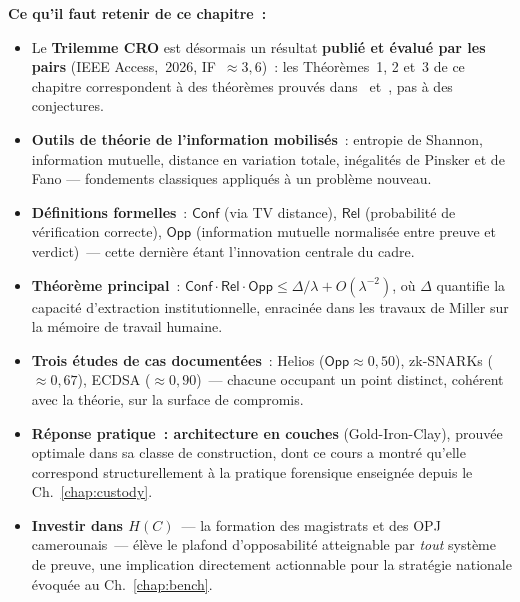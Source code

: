 \separateur

\begin{boxresume}
\textbf{Ce qu'il faut retenir de ce chapitre~:}
\begin{itemize}
    \item Le \textbf{Trilemme CRO} est désormais un résultat
          \textbf{publié et évalué par les pairs}
          (IEEE Access,~2026, IF~$\approx 3{,}6$)~: les
          Théorèmes~1, 2 et~3 de ce chapitre correspondent à des
          théorèmes prouvés dans~\cite{minka2026clo}
          et~\cite{minka2026conditional}, pas à des conjectures.

    \item \textbf{Outils de théorie de l'information mobilisés}~:
          entropie de Shannon, information mutuelle, distance en
          variation totale, inégalités de Pinsker et de Fano
          --- fondements classiques appliqués à un problème nouveau.

    \item \textbf{Définitions formelles}~: $\mathsf{Conf}$ (via TV
          distance), $\mathsf{Rel}$ (probabilité de vérification
          correcte), $\mathsf{Opp}$ (information mutuelle normalisée
          entre preuve et verdict)~--- cette dernière étant
          l'innovation centrale du cadre.

    \item \textbf{Théorème principal}~: $\mathsf{Conf} \cdot
          \mathsf{Rel} \cdot \mathsf{Opp} \leq \Delta/\lambda +
          O(\lambda^{-2})$, où $\Delta$ quantifie la capacité
          d'extraction institutionnelle, enracinée dans les travaux
          de Miller sur la mémoire de travail humaine.

    \item \textbf{Trois études de cas documentées}~: Helios
          ($\mathsf{Opp}\approx 0{,}50$), zk-SNARKs
          ($\approx 0{,}67$), ECDSA ($\approx 0{,}90$)~---
          chacune occupant un point distinct, cohérent avec la
          théorie, sur la surface de compromis.

    \item \textbf{Réponse pratique~: architecture en couches}
          (Gold-Iron-Clay), prouvée optimale dans sa classe de
          construction, dont ce cours a montré qu'elle correspond
          structurellement à la pratique forensique enseignée
          depuis le Ch.~\ref{chap:custody}.

    \item \textbf{Investir dans $H(C)$}~--- la formation des
          magistrats et des OPJ camerounais~--- élève le plafond
          d'opposabilité atteignable par \emph{tout} système de
          preuve, une implication directement actionnable pour
          la stratégie nationale évoquée au Ch.~\ref{chap:bench}.
\end{itemize}
\end{boxresume}

